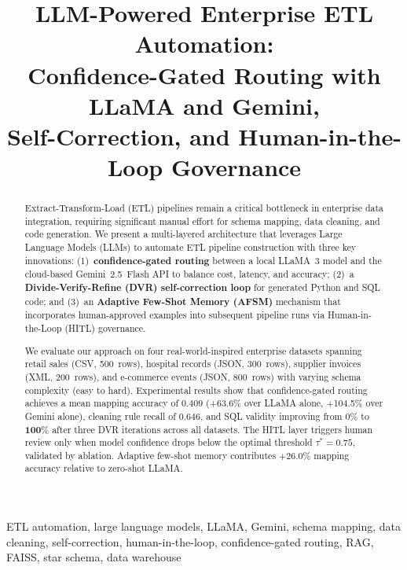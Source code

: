 \documentclass[conference]{IEEEtran}
\title{LLM-Powered Enterprise ETL Automation:\\
Confidence-Gated Routing with LLaMA and Gemini,\\
Self-Correction, and Human-in-the-Loop Governance}
\author{
\IEEEauthorblockN{Syrine Maaroufi}
\IEEEauthorblockA{
\textit{Business Intelligence Engineering}\\
University of Tunis\\
syrine.mrf@gmail.com}
}
\begin{document}
\maketitle

\begin{abstract}
Extract-Transform-Load (ETL) pipelines remain a critical bottleneck in
enterprise data integration, requiring significant manual effort for schema
mapping, data cleaning, and code generation. We present a multi-layered
architecture that leverages Large Language Models (LLMs) to automate ETL
pipeline construction with three key innovations: (1)~\textbf{confidence-gated
routing} between a local LLaMA~3 model and the cloud-based Gemini~2.5~Flash
API to balance cost, latency, and accuracy; (2)~a \textbf{Divide-Verify-Refine
(DVR) self-correction loop} for generated Python and SQL code; and
(3)~an \textbf{Adaptive Few-Shot Memory (AFSM)} mechanism that incorporates
human-approved examples into subsequent pipeline runs via
Human-in-the-Loop (HITL) governance.

We evaluate our approach on four real-world-inspired enterprise datasets
spanning retail sales (CSV, 500~rows), hospital records (JSON, 300~rows),
supplier invoices (XML, 200~rows), and e-commerce events (JSON, 800~rows)
with varying schema complexity (easy to hard).
Experimental results show that confidence-gated routing achieves a mean
mapping accuracy of $\mathbf{0.409}$ (+63.6\% over LLaMA alone, +104.5\%
over Gemini alone), cleaning rule recall of $0.646$, and SQL validity
improving from $0\%$ to $\mathbf{100\%}$ after three DVR iterations across
all datasets. The HITL layer triggers human review only when model confidence
drops below the optimal threshold $\tau^*=0.75$, validated by ablation.
Adaptive few-shot memory contributes $+26.0\%$ mapping accuracy relative to
zero-shot LLaMA.
\end{abstract}

\begin{IEEEkeywords}
ETL automation, large language models, LLaMA, Gemini, schema mapping,
data cleaning, self-correction, human-in-the-loop, confidence-gated routing,
RAG, FAISS, star schema, data warehouse
\end{IEEEkeywords}

\end{document}
